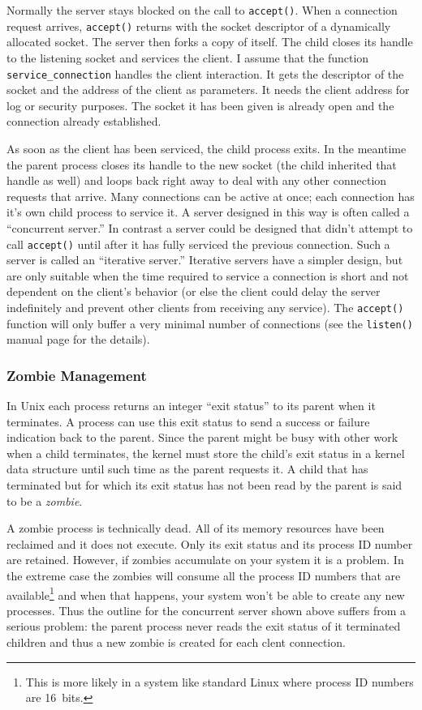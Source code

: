 \documentclass{article}
\newcommand{\newterm}[1]{\textit{#1}}
\begin{document}
Normally the server stays blocked on the call to \texttt{accept()}. When a connection request arrives, \texttt{accept()} returns with the socket descriptor of a dynamically allocated socket. The server then forks a copy of itself. The child closes its handle to the listening socket and services the client. I assume that the function \texttt{service\_connection} handles the client interaction. It gets the descriptor of the socket and the address of the client as parameters. It needs the client address for log or security purposes. The socket it has been given is already open and the connection already established.

As soon as the client has been serviced, the child process exits. In the meantime the parent process closes its handle to the new socket (the child inherited that handle as well) and loops back right away to deal with any other connection requests that arrive. Many connections can be active at once; each connection has it's own child process to service it. A server designed in this way is often called a ``concurrent server.'' In contrast a server could be designed that didn't attempt to call \texttt{accept()} until after it has fully serviced the previous connection. Such a server is called an ``iterative server.'' Iterative servers have a simpler design, but are only suitable when the time required to service a connection is short and not dependent on the client's behavior (or else the client could delay the server indefinitely and prevent other clients from receiving any service). The \texttt{accept()} function will only buffer a very minimal number of connections (see the \texttt{listen()} manual page for the details).

\subsubsection{Zombie Management}

In Unix each process returns an integer ``exit status'' to its parent when it terminates. A process can use this exit status to send a success or failure indication back to the parent. Since the parent might be busy with other work when a child terminates, the kernel must store the child's exit status in a kernel data structure until such time as the parent requests it. A child that has terminated but for which its exit status has not been read by the parent is said to be a \newterm{zombie}.

A zombie process is technically dead. All of its memory resources have been reclaimed and it does not execute. Only its exit status and its process ID number are retained. However, if zombies accumulate on your system it is a problem. In the extreme case the zombies will consume all the process ID numbers that are available\footnote{This is more likely in a system like standard Linux where process ID numbers are 16~bits.} and when that happens, your system won't be able to create any new processes. Thus the outline for the concurrent server shown above suffers from a serious problem: the parent process never reads the exit status of it terminated children and thus a new zombie is created for each clent connection.
\end{document}
